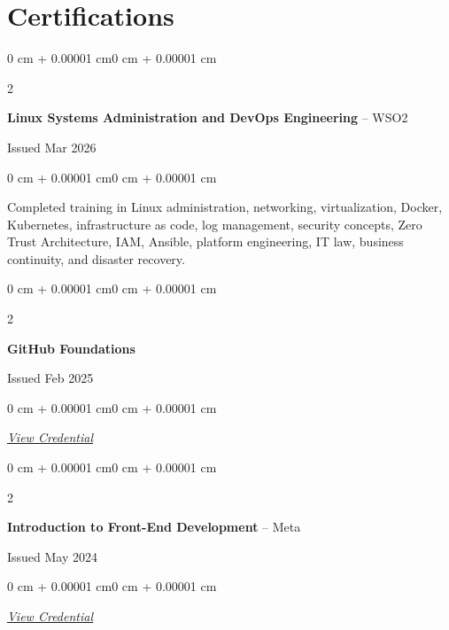 \documentclass[10pt, letterpaper]{article}
\let\oldhref\href
\renewcommand{\href}[2]{\oldhref{#1}{\textit{\underline{#2}}}}
\newenvironment{onecolentry}{
    \begin{adjustwidth}{0 cm + 0.00001 cm}{0 cm + 0.00001 cm}
}{
    \end{adjustwidth}
}
\newenvironment{twocolentry}[2][]{
    \onecolentry
    \def\secondColumn{#2}
    \setcolumnwidth{\fill, 4.5 cm}
    \begin{paracol}{2}
}{
    \switchcolumn \raggedleft \secondColumn
    \end{paracol}
    \endonecolentry
}
\begin{document}
    \section{Certifications}
    \begin{twocolentry}{
        Issued Mar 2026
    }
        \textbf{Linux Systems Administration and DevOps Engineering} -- WSO2
    \end{twocolentry}

    \vspace{0.10 cm}

    \begin{onecolentry}
        Completed training in Linux administration, networking, virtualization, Docker, Kubernetes, infrastructure as code, log management, security concepts, Zero Trust Architecture, IAM, Ansible, platform engineering, IT law, business continuity, and disaster recovery.
    \end{onecolentry}

    \vspace{0.2 cm}

    \begin{twocolentry}{
        Issued Feb 2025
    }
        \textbf{GitHub Foundations}
    \end{twocolentry}

    \vspace{0.10 cm}

    \begin{onecolentry}
        \href{https://www.coursera.org/account/accomplishments/verify/2JRCDBLVWHG5}{View Credential}
    \end{onecolentry}

    \vspace{0.2 cm}

    \begin{twocolentry}{
        Issued May 2024
    }
        \textbf{Introduction to Front-End Development} -- Meta
    \end{twocolentry}

    \vspace{0.10 cm}

    \begin{onecolentry}
        \href{https://www.coursera.org/account/accomplishments/records/PUYQP4GWPDN6}{View Credential}
    \end{onecolentry}
\end{document}
